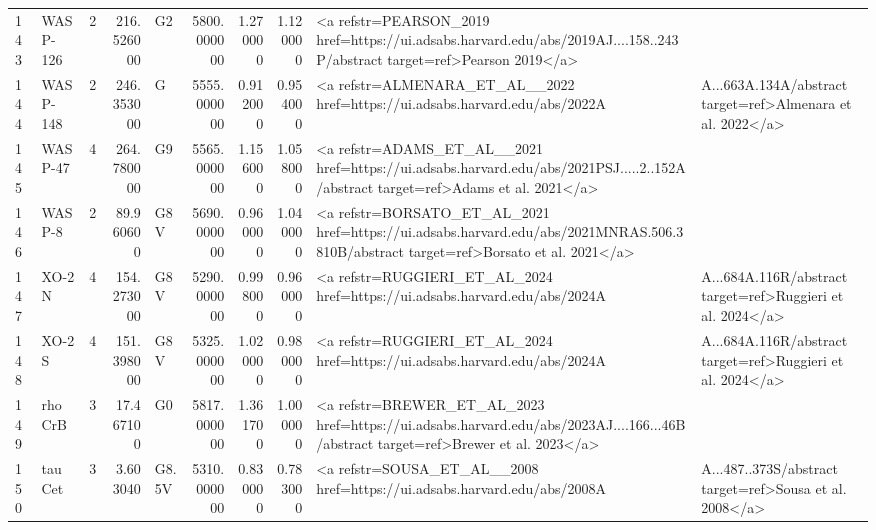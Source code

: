 \begin{tabular}{llrrlrrrl}
143 & WASP-126 & 2 & 216.526000 & G2 & 5800.000000 & 1.270000 & 1.120000 & <a refstr=PEARSON_2019 href=https://ui.adsabs.harvard.edu/abs/2019AJ....158..243P/abstract target=ref>Pearson 2019</a> \\
144 & WASP-148 & 2 & 246.353000 & G & 5555.000000 & 0.912000 & 0.954000 & <a refstr=ALMENARA_ET_AL__2022 href=https://ui.adsabs.harvard.edu/abs/2022A&A...663A.134A/abstract target=ref>Almenara et al. 2022</a> \\
145 & WASP-47 & 4 & 264.780000 & G9 & 5565.000000 & 1.156000 & 1.058000 & <a refstr=ADAMS_ET_AL__2021 href=https://ui.adsabs.harvard.edu/abs/2021PSJ.....2..152A/abstract target=ref>Adams et al. 2021</a> \\
146 & WASP-8 & 2 & 89.960600 & G8 V & 5690.000000 & 0.960000 & 1.040000 & <a refstr=BORSATO_ET_AL_2021 href=https://ui.adsabs.harvard.edu/abs/2021MNRAS.506.3810B/abstract target=ref>Borsato et al. 2021</a> \\
147 & XO-2 N & 4 & 154.273000 & G8 V & 5290.000000 & 0.998000 & 0.960000 & <a refstr=RUGGIERI_ET_AL_2024 href=https://ui.adsabs.harvard.edu/abs/2024A&A...684A.116R/abstract target=ref>Ruggieri et al. 2024</a> \\
148 & XO-2 S & 4 & 151.398000 & G8 V & 5325.000000 & 1.020000 & 0.980000 & <a refstr=RUGGIERI_ET_AL_2024 href=https://ui.adsabs.harvard.edu/abs/2024A&A...684A.116R/abstract target=ref>Ruggieri et al. 2024</a> \\
149 & rho CrB & 3 & 17.467100 & G0 & 5817.000000 & 1.361700 & 1.000000 & <a refstr=BREWER_ET_AL_2023 href=https://ui.adsabs.harvard.edu/abs/2023AJ....166...46B/abstract target=ref>Brewer et al. 2023</a> \\
150 & tau Cet & 3 & 3.603040 & G8.5V & 5310.000000 & 0.830000 & 0.783000 & <a refstr=SOUSA_ET_AL__2008 href=https://ui.adsabs.harvard.edu/abs/2008A&A...487..373S/abstract target=ref>Sousa et al. 2008</a> \\
\bottomrule
\end{tabular}
